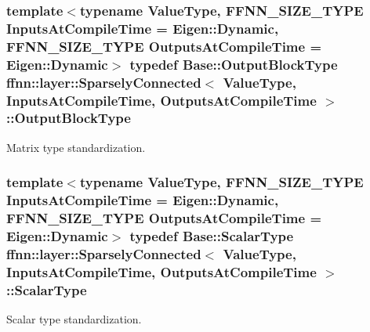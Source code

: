 \hypertarget{classffnn_1_1layer_1_1_sparsely_connected_aacf4fb49a3f57aba90e55d8d3c63cf45}{
\subsubsection[{Output\-Block\-Type}]{\setlength{\rightskip}{0pt plus 5cm}template$<$typename Value\-Type, F\-F\-N\-N\-\_\-\-S\-I\-Z\-E\-\_\-\-T\-Y\-P\-E Inputs\-At\-Compile\-Time = Eigen\-::\-Dynamic, F\-F\-N\-N\-\_\-\-S\-I\-Z\-E\-\_\-\-T\-Y\-P\-E Outputs\-At\-Compile\-Time = Eigen\-::\-Dynamic$>$ typedef Base\-::\-Output\-Block\-Type {\bf ffnn\-::layer\-::\-Sparsely\-Connected}$<$ Value\-Type, Inputs\-At\-Compile\-Time, Outputs\-At\-Compile\-Time $>$\-::{\bf Output\-Block\-Type}}}\label{classffnn_1_1layer_1_1_sparsely_connected_aacf4fb49a3f57aba90e55d8d3c63cf45}


Matrix type standardization. 

\hypertarget{classffnn_1_1layer_1_1_sparsely_connected_abe2b75254f39c0bec9f02b2e906e7919}{
\subsubsection[{Scalar\-Type}]{\setlength{\rightskip}{0pt plus 5cm}template$<$typename Value\-Type, F\-F\-N\-N\-\_\-\-S\-I\-Z\-E\-\_\-\-T\-Y\-P\-E Inputs\-At\-Compile\-Time = Eigen\-::\-Dynamic, F\-F\-N\-N\-\_\-\-S\-I\-Z\-E\-\_\-\-T\-Y\-P\-E Outputs\-At\-Compile\-Time = Eigen\-::\-Dynamic$>$ typedef {\bf Base\-::\-Scalar\-Type} {\bf ffnn\-::layer\-::\-Sparsely\-Connected}$<$ Value\-Type, Inputs\-At\-Compile\-Time, Outputs\-At\-Compile\-Time $>$\-::{\bf Scalar\-Type}}}\label{classffnn_1_1layer_1_1_sparsely_connected_abe2b75254f39c0bec9f02b2e906e7919}


Scalar type standardization. 

